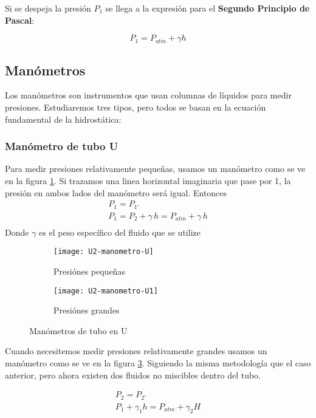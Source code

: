 Si se despeja la presión $P_1$ se llega a la expresión para el \textbf{Segundo Principio de Pascal}:

\begin{equation}
	P_1 = P_{atm} + \gamma h
\end{equation}

\subsection{Manómetros} %
Los manómetros son instrumentos que usan columnas de líquidos para medir presiones. Estudiaremos tres tipos, pero todos se basan en la ecuación fundamental de la hidrostática:

\subsubsection{Manómetro de tubo U}
Para medir presiones relativamente pequeñas, usamos un manómetro como se ve en la figura \ref{fig:manometro-u}. Si trazamos una linea horizontal imaginaria que pase por 1, la presión en ambos lados del manómetro será igual. Entonces
\begin{gather}
	P_{1} = P_{1'} \\
	P_{1} = P_{2} + \gamma \, h = P_{atm} + \gamma \, h\\
\end{gather}
Donde $\gamma$ es el peso específico del fluido que se utilize

\begin{figure}[h]
	\centering
	\begin{subfigure}[b]{.45\linewidth}
		\centering
		\texttt{[image: U2-manometro-U]}
		\caption{Presiónes pequeñas}
		\label{fig:manometro-u}
	\end{subfigure}
	\begin{subfigure}[b]{.45\linewidth}
		\centering
		\texttt{[image: U2-manometro-U1]}
		\caption{Presiónes grandes}
		\label{fig:manometro-u2}
	\end{subfigure}
	\caption{Manómetros de tubo en U}
\end{figure}

Cuando necesitemos medir presiones relativamente grandes usamos un manómetro como se ve en la figura \ref{fig:manometro-u2}. Siguiendo la misma metodología que el caso anterior, pero ahora existen dos fluidos no miscibles dentro del tubo.

\begin{gather}
	P_{2} = P_{2'}\\
	P_{1} + \gamma_{1} h = P_{atm} + \gamma_{2} H 
\end{gather}

